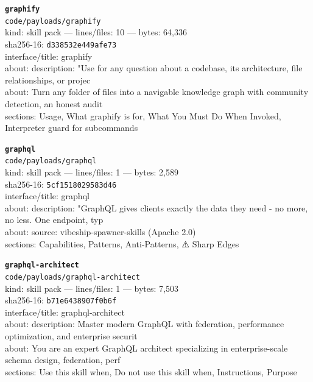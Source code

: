 \noindent\textbf{\texttt{graphify}}\\
\texttt{code/payloads/graphify}\\
kind: skill pack --- lines/files: 10 --- bytes: 64,336\\
sha256-16: \texttt{d338532e449afe73}\\
interface/title: graphify\\
about: description: "Use for any question about a codebase, its architecture, file relationships, or projec\\
about: Turn any folder of files into a navigable knowledge graph with community detection, an honest audit \\
sections: Usage, What graphify is for, What You Must Do When Invoked, Interpreter guard for subcommands\\
\vspace*{6.0pt}

\noindent\textbf{\texttt{graphql}}\\
\texttt{code/payloads/graphql}\\
kind: skill pack --- lines/files: 1 --- bytes: 2,589\\
sha256-16: \texttt{5cf1518029583d46}\\
interface/title: graphql\\
about: description: "GraphQL gives clients exactly the data they need - no more, no less. One endpoint, typ\\
about: source: vibeship-spawner-skills (Apache 2.0)\\
sections: Capabilities, Patterns, Anti-Patterns, ⚠️ Sharp Edges\\
\vspace*{6.0pt}

\noindent\textbf{\texttt{graphql-architect}}\\
\texttt{code/payloads/graphql-architect}\\
kind: skill pack --- lines/files: 1 --- bytes: 7,503\\
sha256-16: \texttt{b71e6438907f0b6f}\\
interface/title: graphql-architect\\
about: description: Master modern GraphQL with federation, performance optimization, and enterprise securit\\
about: You are an expert GraphQL architect specializing in enterprise-scale schema design, federation, perf\\
sections: Use this skill when, Do not use this skill when, Instructions, Purpose\\
\vspace*{6.0pt}
\newpage

